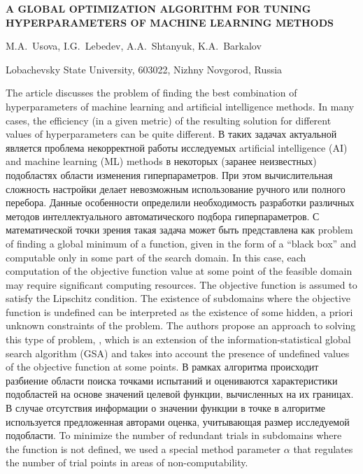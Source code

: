 \documentclass[a4paper,12pt,russian]{article}
\begin{document}
\begin{center}
	\textbf{A GLOBAL OPTIMIZATION ALGORITHM FOR \break
    TUNING HYPERPARAMETERS OF MACHINE LEARNING METHODS} 
\end{center}

\begin{center}
{M.A.~Usova, I.G.~Lebedev, A.A.~Shtanyuk, K.A.~Barkalov}
\end{center}

\begin{center}
{Lobachevsky State University, 603022, Nizhny Novgorod, Russia}
\end{center}
\begin{small}

The article discusses  the problem of finding the best combination of hyperparameters of machine learning and artificial intelligence methods. In many cases, the efficiency (in a given metric) of the resulting solution for different values of hyperparameters can be quite different.
В таких задачах актуальной является проблема некорректной работы исследуемых artificial intelligence (AI) and machine learning (ML) methods в некоторых (заранее неизвестных) подобластях области изменения гиперпараметров. При этом вычислительная сложность настройки делает невозможным использование ручного или полного перебора. Данные особенности определили необходимость разработки различных методов интеллектуального автоматического подбора гиперпараметров.
С математической точки зрения такая задача может быть представлена как problem of finding a global minimum of a function, given in the form of a ``black box'' and computable only in some part of the search domain. In this case, each computation of the objective function value at some point of the feasible domain may require significant computing resources. The objective function is assumed to satisfy the Lipschitz condition. The existence of subdomains where the objective function is undefined can be interpreted as the existence of some hidden, a priori unknown constraints of the problem. 
The authors propose an approach to solving this type of problem, , which is an extension of the information-statistical global search algorithm (GSA) and takes into account the presence of undefined values of the objective function at some points. В рамках алгоритма происходит разбиение области поиска точками испытаний и оцениваются характеристики подобластей на основе значений целевой функции, вычисленных на их границах. В случае отсутствия информации о значении функции в точке в алгоритме используется предложенная авторами оценка, учитывающая размер исследуемой подобласти. To minimize the number of redundant trials in subdomains where the function is not defined, we used a special method parameter $\alpha$ that regulates the number of trial points in areas of non-computability.

\end{small}
\end{document}
